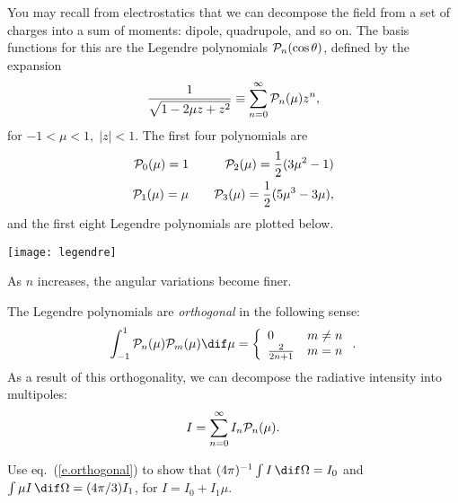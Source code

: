 \begin{sidebar}
\label{sb.intensity-decomposition}
You may recall from electrostatics that we can decompose the field from a set of charges into a sum of moments: dipole, quadrupole, and so on. The basis functions for this are the Legendre polynomials $\mathcal{P}_{n}(\cos\theta)$, defined by the expansion
\[
	\frac{1}{\sqrt{1 - 2\mu z + z^{2}}} \equiv \sum_{n=0}^{\infty}\mathcal{P}_{n}(\mu)z^{n},
\]
for $-1<\mu<1,\;|z| < 1$. The first four polynomials are
\begin{eqnarray*}
	\mathcal{P}_{0}(\mu) = 1 &\quad& \mathcal{P}_{2}(\mu) = \frac{1}{2}(3\mu^{2}-1)\\
	\mathcal{P}_{1}(\mu) = \mu &\quad& \mathcal{P}_{3}(\mu) = \frac{1}{2}(5\mu^{3}-3\mu),
\end{eqnarray*}
and the first eight Legendre polynomials are plotted below.

\texttt{[image: legendre]}

\noindent As $n$ increases, the angular variations become finer.

The Legendre polynomials are \emph{orthogonal} in the following sense:
\begin{equation}\label{e.orthogonal}
\int_{-1}^{1}\Pl{n}(\mu)\Pl{m}(\mu)\dif \mu = \left\{
\begin{array}{lr}
	0 &  m\neq n\\
	\frac{2}{2n+1} & m=n
\end{array}\right..
\end{equation}
As a result of this orthogonality, we can decompose the radiative intensity into multipoles:
\begin{equation}\label{e.decomposition}
	I = \sum_{n=0}^{\infty} I_{n} \mathcal{P}_{n}(\mu).
\end{equation}

\begin{exercisebox}
\label{e.symmetry-powers-mu}
Use eq.~(\ref{e.orthogonal}) to show that $(4\pi)^{-1}\int I\,\dif\Omega = I_{0}$ and $\int \mu I\,\dif\Omega = (4\pi/3)I_{1}$, for $I = I_{0} + I_{1}\mu$.
\end{exercisebox}

\end{sidebar}

